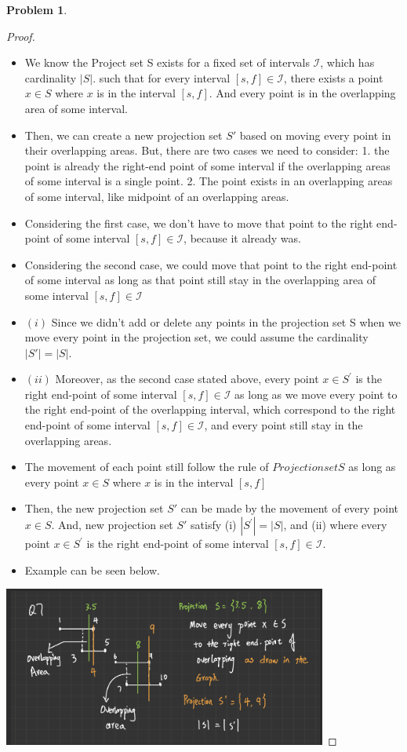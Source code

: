 \documentclass[11pt]{article}
\theoremstyle{definition}
\theoremstyle{definition}
\newtheorem{required}{Problem}
\theoremstyle{definition}
\begin{document}
\begin{required}
\begin{enumerate}[label=(\alph*)]
\begin{proof}
\begin{itemize}
\item We know the Project set S exists for a fixed set of intervals $\mathcal{I}$, which has cardinality $|S|$.  such that for every interval $[s, f] \in \mathcal{I}$, there exists a point $x \in S$ where $x$ is in the interval $[s, f]$. And every point is in the overlapping area of some interval.
\item Then, we can create a new projection set $S'$ based on moving every point in their overlapping areas. But, there are two cases we need to consider: 1. the point is already the right-end point of some interval if the overlapping areas of some  interval is a single point. 2. The point exists  in an overlapping areas of some interval, like midpoint of an overlapping areas.
\item Considering the first case, we don't have to move that point to the right end-point of some interval $[s, f] \in \mathcal{I}$, because it already was.
\item Considering the second case, we could move that point to the right end-point of some interval as long as that point still stay in the overlapping area of some interval $[s, f] \in \mathcal{I}$
\item $(i)$ Since we didn't add or delete any points in the projection set S when we move every point in the projection set, we could assume the cardinality$|S'| = |S|$.
\item $(ii)$ Moreover, as the second case stated above, every point $x \in S^{\prime}$ is the right end-point of some interval $[s, f] \in \mathcal{I}$ as long as we move every point to the right end-point of the overlapping interval, which correspond to the right end-point of some interval $[s, f] \in \mathcal{I}$, and every point still stay in the overlapping areas. 
\item The movement of each point still follow the rule of $Projection set S$ as long as every point  $x \in S$ where $x$ is in the interval $[s, f]$
\item Then, the new projection set $S'$ can be made by the movement of every point $x \in S$. And, new projection set $S'$ satisfy (i) $|S^{\prime}| = |S|$, and (ii) where every point $x \in S^{\prime}$ is the right end-point of some interval $[s, f] \in \mathcal{I}$. 
\item Example can be seen below.
\end{itemize}
\includegraphics[width=0.8\textwidth]{Problem7.PNG}
\end{proof}


\end{enumerate}
\end{required}
\end{document}
